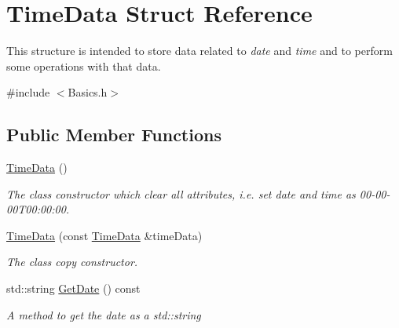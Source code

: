 \hypertarget{structTimeData}{}\section{Time\+Data Struct Reference}
\label{structTimeData}


This structure is intended to store data related to {\itshape date} and {\itshape time} and to perform some operations with that data.  




{\ttfamily \#include $<$Basics.\+h$>$}

\subsection*{Public Member Functions}
\begin{DoxyCompactItemize}
\item 
\mbox{\label{structTimeData_a4be51d0cd0dce3b91ce449b6c995a9e9}} 
\hyperlink{structTimeData_a4be51d0cd0dce3b91ce449b6c995a9e9}{Time\+Data} ()
\begin{DoxyCompactList}\small\item\em The class\textquotesingle{} constructor which clear all attributes, i.\+e. set date and time as 00-\/00-\/00\+T00\+:00\+:00. \end{DoxyCompactList}\item 
\mbox{\label{structTimeData_af0454b54d768d6b21267b3692dae4d3d}} 
\hyperlink{structTimeData_af0454b54d768d6b21267b3692dae4d3d}{Time\+Data} (const \hyperlink{structTimeData}{Time\+Data} \&time\+Data)
\begin{DoxyCompactList}\small\item\em The class\textquotesingle{} copy constructor. \end{DoxyCompactList}\item 
\mbox{\label{structTimeData_a78640fbf87e59255e08836b6779ec5c0}} 
std\+::string \hyperlink{structTimeData_a78640fbf87e59255e08836b6779ec5c0}{Get\+Date} () const
\begin{DoxyCompactList}\small\item\em A method to get the date as a {\ttfamily std\+::string} \end{DoxyCompactList}\item 
\mbox{\label{structTimeData_a6810621b9bd2289b697a7cd7b1799515}} 

\end{DoxyCompactItemize}
